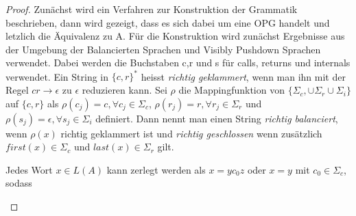 \begin{proof}
Zunächst wird ein Verfahren zur Konstruktion der Grammatik beschrieben, dann wird gezeigt, dass es sich dabei um eine OPG handelt und letzlich die Äquivalenz zu A.
Für die Konstruktion wird zunächst Ergebnisse aus der Umgebung der Balancierten Sprachen und Visibly Pushdown Sprachen verwendet. Dabei werden die Buchstaben c,r und s für calls, returns und internals verwendet. Ein String in $\{c, r\}^*$ heisst \textit{richtig geklammert}, wenn man ihn mit der Regel $cr \rightarrow \epsilon$ zu $\epsilon$ reduzieren kann. Sei $\rho$ die Mappingfunktion von $\{\Sigma_c, \cup \Sigma_r \cup \Sigma_i\}$ auf $\{c,r\}$ als $\rho(c_j)=c, \forall c_j\in \Sigma_c$, $\rho(r_j)=r, \forall r_j\in \Sigma_r$ und $\rho(s_j)=\epsilon, \forall s_j\in \Sigma_i$ definiert. Dann nennt man einen String \textit{richtig balanciert}, wenn $\rho(x)$ richtig geklammert ist und \textit{richtig geschlossen} wenn zusätzlich $first(x) \in \Sigma_c$ und $last(x)\in \Sigma_r$ gilt.
\begin{lemma}
\label{factorize}
Jedes Wort $x\in L(A)$ kann zerlegt werden als $x=yc_0z$ oder $x=y$ mit $c_0\in \Sigma_c$, sodass
\begin{itemize}


\end{itemize}
\end{lemma}
\end{proof}
